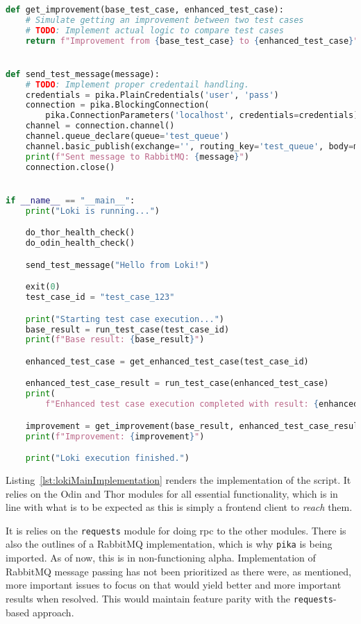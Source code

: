 \begin{lstlisting}[caption={loki/main.py, The implementation of the Loki script.}, label={lst:lokiMainImplementation}, language={Python}]
def get_improvement(base_test_case, enhanced_test_case):
    # Simulate getting an improvement between two test cases
    # TODO: Implement actual logic to compare test cases
    return f"Improvement from {base_test_case} to {enhanced_test_case}"


def send_test_message(message):
    # TODO: Implement proper credentail handling.
    credentials = pika.PlainCredentials('user', 'pass')
    connection = pika.BlockingConnection(
        pika.ConnectionParameters('localhost', credentials=credentials))
    channel = connection.channel()
    channel.queue_declare(queue='test_queue')
    channel.basic_publish(exchange='', routing_key='test_queue', body=message)
    print(f"Sent message to RabbitMQ: {message}")
    connection.close()


if __name__ == "__main__":
    print("Loki is running...")

    do_thor_health_check()
    do_odin_health_check()

    send_test_message("Hello from Loki!")

    exit(0)
    test_case_id = "test_case_123"

    print("Starting test case execution...")
    base_result = run_test_case(test_case_id)
    print(f"Base result: {base_result}")

    enhanced_test_case = get_enhanced_test_case(test_case_id)

    enhanced_test_case_result = run_test_case(enhanced_test_case)
    print(
        f"Enhanced test case execution completed with result: {enhanced_test_case_result}")

    improvement = get_improvement(base_result, enhanced_test_case_result)
    print(f"Improvement: {improvement}")

    print("Loki execution finished.")

\end{lstlisting}


Listing~\ref{lst:lokiMainImplementation} renders the implementation of the
script. It relies on the Odin and Thor modules for all essential functionality,
which is in line with what is to be expected as this is simply a frontend client
to \emph{reach} them.

It is relies on the \texttt{requests} module for doing \acrfull{rpc} to the
other modules. There is also the outlines of a RabbitMQ implementation, which is
why \texttt{pika} is being imported. As of now, this is in non-functioning
alpha. Implementation of RabbitMQ message passing has not been prioritized as
there were, as mentioned, more important issues to focus on that would yield
better and more important results when resolved. This would maintain feature
parity with the \texttt{requests}-based approach.
